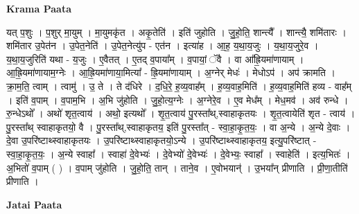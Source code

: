 \documentclass[17pt]{extarticle}
\begin{document}
\textbf{Krama Paata} \newline

यत् प॒शुः । प॒शुर् मा॒युम् । मा॒युमकृ॑त । अकृ॒तेति॑ । इति॑ जुहोति । जु॒हो॒ति॒ शान्त्यै᳚ । शान्त्यै॒ शमि॑तारः । शमि॑तार उ॒पेत॑न । उ॒पेत॒नेति॑ । उ॒पेत॒नेत्यु॑प - एत॑न । इत्या॑ह । आ॒ह॒ य॒था॒य॒जुः । य॒था॒य॒जुरे॒व । य॒था॒य॒जुरिति॑ यथा - य॒जुः । ए॒वैतत् । ए॒तद् व॒पाया᳚म् । व॒पायां॒ ॅवै । वा आ᳚ह्रि॒यमा॑णायाम् । आ॒ह्रि॒यमा॑णायाम॒ग्नेः । आ॒ह्रि॒यमा॑णाया॒मित्या᳚ - ह्रि॒यमा॑णायाम् । अ॒ग्नेर् मेधः॑ । मेधोऽप॑ । अप॑ क्रामति । क्रा॒म॒ति॒ त्वाम् । त्वामु॑ । उ॒ ते । ते द॑धिरे । द॒धि॒रे॒ ह॒व्य॒वाह᳚म् । ह॒व्य॒वाह॒मिति॑ । ह॒व्य॒वाह॒मिति॑ हव्य - वाह᳚म् । इति॑ व॒पाम् । व॒पाम॒भि । अ॒भि जु॑होति । जु॒हो॒त्य॒ग्नेः । अ॒ग्नेरे॒व । ए॒व मेध᳚म् । मेध॒मव॑ । अव॑ रुन्धे । रु॒न्धेऽथो᳚ । अथो॑ शृत॒त्वाय॑ । अथो॒ इत्यथो᳚ । शृ॒त॒त्वाय॑ पु॒रस्ता᳚थ्,स्वाहाकृतयः । शृ॒त॒त्वायेति॑ शृत - त्वाय॑ । पु॒रस्ता᳚थ् स्वाहाकृतयो॒ वै । पु॒रस्ता᳚थ्,स्वाहाकृतय॒ इति॑ पु॒रस्ता᳚त् - स्वा॒हा॒कृ॒त॒यः॒ । वा अ॒न्ये । अ॒न्ये दे॒वाः । दे॒वा उ॒परि॑ष्टाथ्स्वाहाकृतयः । उ॒परि॑ष्टाथ्स्वाहाकृतयो॒ऽन्ये । उ॒परि॑ष्टाथ्स्वाहाकृतय॒ इत्यु॒परि॑ष्टात् - स्वा॒हा॒कृ॒त॒यः॒ । अ॒न्ये स्वाहा᳚ । स्वाहा॑ दे॒वेभ्यः॑ । दे॒वेभ्यो॑ दे॒वेभ्यः॑ । दे॒वेभ्यः॒ स्वाहा᳚ । स्वाहेति॑ । इत्य॒भितः॑ । अ॒भितो॑ व॒पाम् ( ) । व॒पाम् जु॑होति । जु॒हो॒ति॒ तान् । ताने॒व । ए॒वोभयान्॑ । उ॒भया᳚न् प्रीणाति । प्री॒णा॒तीति॑ प्रीणाति । \newline

\textbf{Jatai Paata} \newline
\end{document}

